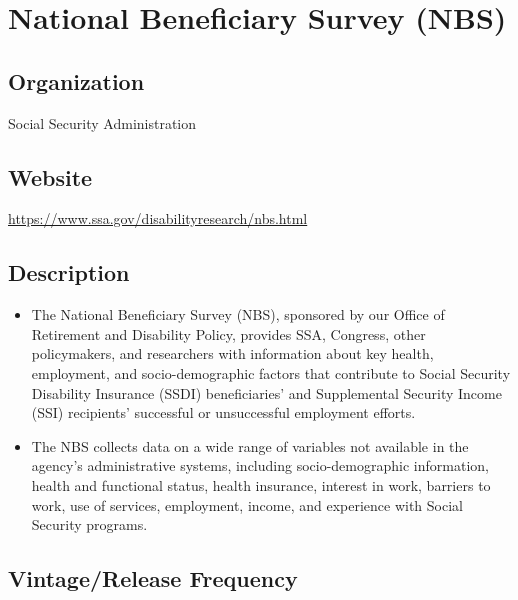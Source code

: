 \documentclass[
]{book}
\providecommand{\tightlist}{%
  \setlength{\itemsep}{0pt}\setlength{\parskip}{0pt}}
\begin{document}
\mainmatter

\hypertarget{national-beneficiary-survey-nbs}{%
\chapter{National Beneficiary Survey (NBS)}\label{national-beneficiary-survey-nbs}}

\hypertarget{organization-43}{%
\section{Organization}\label{organization-43}}

Social Security Administration

\hypertarget{website-43}{%
\section{Website}\label{website-43}}

\url{https://www.ssa.gov/disabilityresearch/nbs.html}

\hypertarget{description-43}{%
\section{Description}\label{description-43}}

\begin{itemize}
\tightlist
\item
  The National Beneficiary Survey (NBS), sponsored by our Office of Retirement and Disability Policy, provides SSA, Congress, other policymakers, and researchers with information about key health, employment, and socio-demographic factors that contribute to Social Security Disability Insurance (SSDI) beneficiaries' and Supplemental Security Income (SSI) recipients' successful or unsuccessful employment efforts.
\item
  The NBS collects data on a wide range of variables not available in the agency's administrative systems, including socio-demographic information, health and functional status, health insurance, interest in work, barriers to work, use of services, employment, income, and experience with Social Security programs.
\end{itemize}

\hypertarget{vintagerelease-frequency-43}{%
\section{Vintage/Release Frequency}\label{vintagerelease-frequency-43}}
\end{document}
